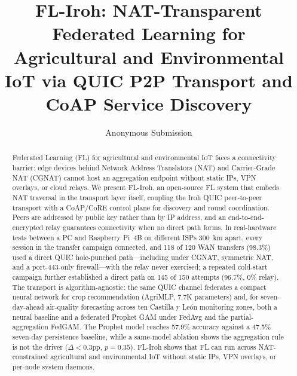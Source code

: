 \documentclass[a4paper,fleqn]{cas-dc}
\begin{document}
\let\WriteBookmarks\relax
\def\floatpagepagefraction{1}
\def\textpagefraction{.001}


\title[mode = title]{FL-Iroh: NAT-Transparent Federated Learning for Agricultural and Environmental IoT via QUIC P2P Transport and CoAP Service Discovery}

\author{Anonymous Submission}

\begin{abstract}
Federated Learning (FL) for agricultural and environmental IoT faces a connectivity barrier: edge devices behind Network Address Translators (NAT) and Carrier-Grade NAT (CGNAT) cannot host an aggregation endpoint without static IPs, VPN overlays, or cloud relays. We present FL-Iroh, an open-source FL system that embeds NAT traversal in the transport layer itself, coupling the Iroh QUIC peer-to-peer transport with a CoAP/CoRE control plane for discovery and round coordination. Peers are addressed by public key rather than by IP address, and an end-to-end-encrypted relay guarantees connectivity when no direct path forms. In real-hardware tests between a PC and Raspberry Pi~4B on different ISPs 300~km apart, every session in the transfer campaign connected, and 118 of 120 WAN transfers (98.3\%) used a direct QUIC hole-punched path---including under CGNAT, symmetric NAT, and a port-443-only firewall---with the relay never exercised; a repeated cold-start campaign further established a direct path on 145 of 150 attempts (96.7\%, 0\% relay). The transport is algorithm-agnostic: the same QUIC channel federates a compact neural network for crop recommendation (AgriMLP, 7.7K parameters) and, for seven-day-ahead air-quality forecasting across ten Castilla y Le\'on monitoring zones, both a neural baseline and a federated Prophet GAM under FedAvg and the partial-aggregation FedGAM. The Prophet model reaches 57.9\% accuracy against a 47.5\% seven-day persistence baseline, while a same-model ablation shows the aggregation rule is not the driver ($\Delta{<}0.3$pp, $p{=}0.35$). FL-Iroh shows that FL can run across NAT-constrained agricultural and environmental IoT without static IPs, VPN overlays, or per-node system daemons.
\end{abstract}
\end{document}
